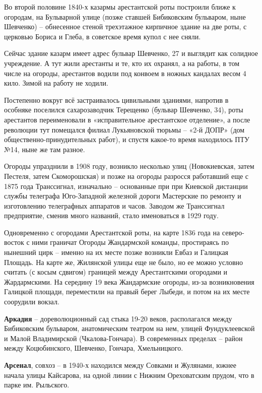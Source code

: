 Во второй половине 1840-х казармы арестантской роты построили ближе к огородам, на Бульварной улице (позже ставшей Бибиковским бульваром, ныне Шевченко) – обнесенное стеной трехэтажное кирпичное здание на две роты, с церковью Бориса и Глеба, в советское время купол с нее сняли.  

Сейчас здание казарм имеет адрес бульвар Шевченко, 27 и выглядит как солидное учреждение. А тут жили арестанты и те, кто их охранял, а на работы, в том числе на огороды, арестантов водили под конвоем в ножных кандалах весом 4 кило. Зимой на работу не ходили.

Постепенно вокруг всё застраивалось цивильными зданиями, напротив в особняке поселился сахарозаводчик Терещенко (бульвар Шевченко, 34), роты арестантов переименовали в «исправительное арестантское отделение», а после революции тут помещался филиал Лукьяновской тюрьмы – «2-й ДОПР» (дом общественно-принудительных работ), и спустя какое-то время находилось ПТУ №14, ныне же там разное.

Огороды упразднили в 1908 году, возникло несколько улиц (Новокиевская, затем Пестеля, затем Скоморошская) и позже на огороды разросся работавший еще с 1875 года Транссигнал, изначально – основанные при при Киевской дистанции службы телеграфа Юго-Западной железной дороги Мастерские по ремонту и изготовлению телеграфных аппаратов и часов. Заводом же Транссигнал предприятие, сменив много названий, стало именоваться в 1929 году.

Одновременно с огородами Арестантской роты, на карте 1836 года на северо-восток с ними граничат Огороды Жандармской команды, простираясь по нынешний цирк – именно на их месте позже возникли Евбаз и Галицкая Площадь. На карте же, Жилянской улицы еще не было, но ее можно условно считать (с косым сдвигом) границей между Арестантскими огородами и Жардармскими. На середину 19 века Жандармские огороды, из-за возникновения Галицкой площади, переместили на правый берег Лыбеди, и потом на их месте соорудили вокзал.\\

\medskip

\textbf{Аркадия} – дореволюционный сад стыка 19-20 веков, располагался между Бибиковским бульваром, анатомическим театром на нем, улицей Фундуклеевской и Малой Владимирской (Чкалова-Гончара). В современных пределах – район между Коцюбинского, Шевченко, Гончара, Хмельницкого.\\ 

\medskip


\textbf{Арсенал}, совхоз – в 1940-х находился между Совками и Жулянами, южнее начала улицы Кайсарова, на одной линии с Нижним Ореховатским прудом, что в парке им. Рыльского.\\

